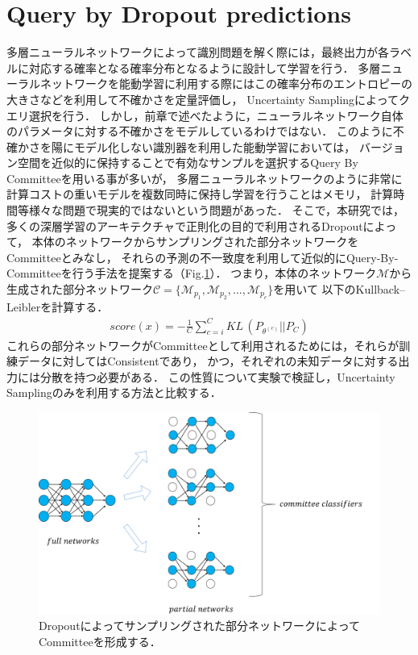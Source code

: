 \section{Query by Dropout predictions}
多層ニューラルネットワークによって識別問題を解く際には，最終出力が各ラベルに対応する確率となる確率分布となるように設計して学習を行う．
多層ニューラルネットワークを能動学習に利用する際にはこの確率分布のエントロピーの大きさなどを利用して不確かさを定量評価し，
Uncertainty Samplingによってクエリ選択を行う．
しかし，前章で述べたように，ニューラルネットワーク自体のパラメータに対する不確かさをモデルしているわけではない．
このように不確かさを陽にモデル化しない識別器を利用した能動学習においては，
バージョン空間を近似的に保持することで有効なサンプルを選択するQuery By Committeeを用いる事が多いが，
多層ニューラルネットワークのように非常に計算コストの重いモデルを複数同時に保持し学習を行うことはメモリ，
計算時間等様々な問題で現実的ではないという問題があった．
そこで，本研究では，多くの深層学習のアーキテクチャで正則化の目的で利用されるDropoutによって，
本体のネットワークからサンプリングされた部分ネットワークをCommitteeとみなし，
それらの予測の不一致度を利用して近似的にQuery-By-Committeeを行う手法を提案する（Fig.\ref{fig:query_by_dropout}）．
つまり，本体のネットワーク$\mathcal{M}$から生成された部分ネットワーク$\mathcal{C} = \{\mathcal{M}_{p_1}, \mathcal{M}_{p_2}, \dots, \mathcal{M}_{p_c} \}$を用いて
以下のKullback–Leiblerを計算する．
\begin{eqnarray}
    score(x) =  -  \frac{1}{C} \sum_{c=i}^C KL \, (P_{\theta^{(c)}} || P_C)
\end{eqnarray}
これらの部分ネットワークがCommitteeとして利用されるためには，それらが訓練データに対してはConsistentであり，
かつ，それぞれの未知データに対する出力には分散を持つ必要がある．
この性質について実験で検証し，Uncertainty Samplingのみを利用する方法と比較する．

\begin{figure}[tbp]
     \begin{center}
      \includegraphics[width=120mm]{figures/query_by_dropout.png}
     \end{center}
    \caption{\label{fig:query_by_dropout}Dropoutによってサンプリングされた部分ネットワークによってCommitteeを形成する．}
\end{figure}

